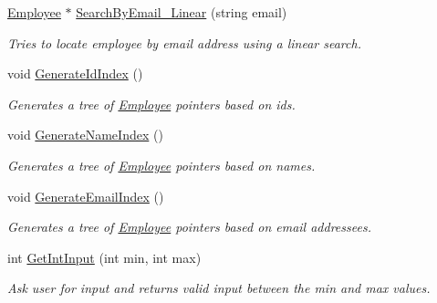 \begin{DoxyCompactItemize}
\hyperlink{structEmployee}{Employee} $\ast$ \hyperlink{classEmployeeManager_a25c3adbfb8b0085f2fdef2749633dbf6}{Search\+By\+Email\+\_\+\+Linear} (string email)
\begin{DoxyCompactList}\small\item\em Tries to locate employee by email address using a linear search. \end{DoxyCompactList}\item 
void \hyperlink{classEmployeeManager_a4eb4039afc670f1b31c95c6cfb7d1980}{Generate\+Id\+Index} ()
\begin{DoxyCompactList}\small\item\em Generates a tree of \hyperlink{structEmployee}{Employee} pointers based on ids. \end{DoxyCompactList}\item 
void \hyperlink{classEmployeeManager_acc8d5ab1c34f3d8a07bcb75352356ac0}{Generate\+Name\+Index} ()
\begin{DoxyCompactList}\small\item\em Generates a tree of \hyperlink{structEmployee}{Employee} pointers based on names. \end{DoxyCompactList}\item 
void \hyperlink{classEmployeeManager_a4cd4e6d8f002496d5d3e970262aa0899}{Generate\+Email\+Index} ()
\begin{DoxyCompactList}\small\item\em Generates a tree of \hyperlink{structEmployee}{Employee} pointers based on email addressees. \end{DoxyCompactList}\item 
int \hyperlink{classEmployeeManager_abafe9deccdf7d3369768fa6538464fb8}{Get\+Int\+Input} (int min, int max)
\begin{DoxyCompactList}\small\item\em Ask user for input and returns valid input between the min and max values. \end{DoxyCompactList}\end{DoxyCompactItemize}
